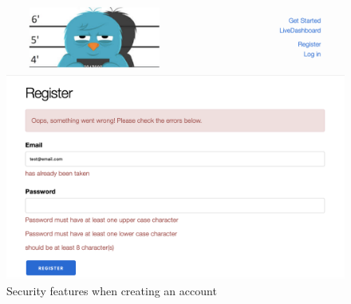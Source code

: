 \begin{figure}[htbp]
	\centering
	\includegraphics[scale=0.25]{figures/sec.png}  %
	\caption{Security features when creating an account}
	\label{fig:sec}
\end{figure}



